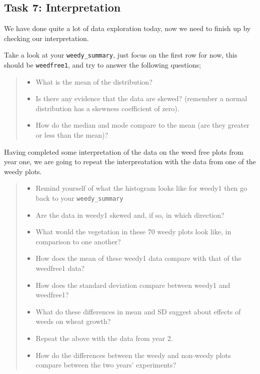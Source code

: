 \documentclass[
]{book}
\providecommand{\tightlist}{%
  \setlength{\itemsep}{0pt}\setlength{\parskip}{0pt}}
\begin{document}
\hypertarget{task-7-interpretation}{%
\subsection{Task 7: Interpretation}\label{task-7-interpretation}}

We have done quite a lot of data exploration today, now we need to finish up by checking our interpretation.

Take a look at your \texttt{weedy\_summary}, just focus on the first row for now, this should be \texttt{weedfree1}, and try to answer the following questions;

\begin{quote}
\begin{itemize}
\tightlist
\item
  What is the mean of the distribution?
\item
  Is there any evidence that the data are skewed? (remember a normal distribution has a skewness coefficient of zero).
\item
  How do the median and mode compare to the mean (are they greater or less than the mean)?
\end{itemize}
\end{quote}

Having completed some interpretation of the data on the weed free plots from year one, we are going to repeat the interpreatation with the data from one of the weedy plots.

\begin{quote}
\begin{itemize}
\tightlist
\item
  Remind yourself of what the histogram looks like for weedy1 then go back to your \texttt{weedy\_summary}
\item
  Are the data in weedy1 skewed and, if so, in which direction?
\item
  What would the vegetation in these 70 weedy plots look like, in comparison to one another?
\item
  How does the mean of these weedy1 data compare with that of the weedfree1 data?
\item
  How does the standard deviation compare between weedy1 and weedfree1?
\item
  What do these differences in mean and SD suggest about effects of weeds on wheat growth?
\item
  Repeat the above with the data from year 2.
\item
  How do the differences between the weedy and non-weedy plots compare between the two years' experiments?
\end{itemize}
\end{quote}
\end{document}

